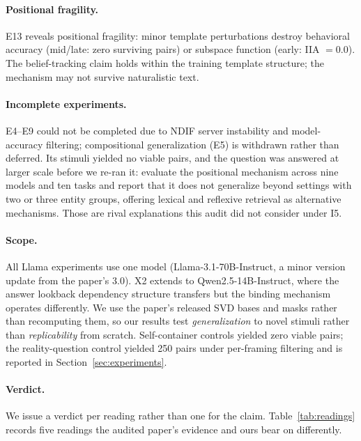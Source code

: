 \documentclass{article}
\begin{document}
\paragraph{Positional fragility.}
E13 reveals positional fragility: minor template perturbations destroy behavioral accuracy (mid/late: zero surviving pairs) or subspace function (early: IIA $= 0.0$). The belief-tracking claim holds within the training template structure; the mechanism may not survive naturalistic text.

\paragraph{Incomplete experiments.}
E4--E9 could not be completed due to NDIF server instability and model-accuracy filtering; compositional generalization (E5) is withdrawn rather than deferred. Its stimuli yielded no viable pairs, and the question was answered at larger scale before we re-ran it: \citet{gurarieh2025mixing} evaluate the positional mechanism across nine models and ten tasks and report that it does not generalize beyond settings with two or three entity groups, offering lexical and reflexive retrieval as alternative mechanisms. Those are rival explanations this audit did not consider under I5.

\paragraph{Scope.}
All Llama experiments use one model (Llama-3.1-70B-Instruct, a minor version update from the paper's 3.0). X2 extends to Qwen2.5-14B-Instruct, where the answer lookback dependency structure transfers but the binding mechanism operates differently. We use the paper's released SVD bases and masks rather than recomputing them, so our results test \emph{generalization} to novel stimuli rather than \emph{replicability} from scratch. Self-container controls yielded zero viable pairs; the reality-question control yielded 250 pairs under per-framing filtering and is reported in Section~\ref{sec:experiments}.

\paragraph{Verdict.}
We issue a verdict per reading rather than one for the claim. Table~\ref{tab:readings}
records five readings the audited paper's evidence and ours bear on differently.
\end{document}
